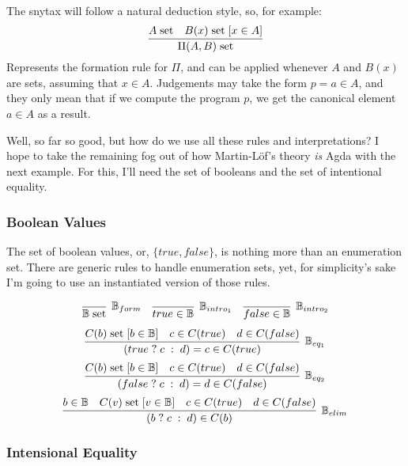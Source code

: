 \newcommand{\isset}[1]{#1 \; \text{set}}
\newcommand{\withhip}[2]{#2 \; [ #1 ] }
\newcommand{\BB}{\mathbb{B}}
\newcommand{\ite}[3]{(#1 \; ? \; #2 \; : \; #3)}
The snytax will follow a natural deduction style, so, for example: 
\[
  \infer{\isset{\Pi(A , B)}}{\isset{A} & \withhip{x \in A}{\isset{B(x)}}}
\]
Represents the formation rule for $\Pi$, and can be applied whenever $A$ and $B(x)$ are sets,
assuming that $x \in A$. Judgements may take the form $p = a \in A$, and they only mean 
that if we compute the program $p$, we get the canonical element $a \in A$ as a result.

Well, so far so good, but how do we use all these rules and interpretations? I hope to take the
remaining fog out of how Martin-L\"{o}f's theory \emph{is} Agda with the next example. For this,
I'll need the set of booleans and the set of intentional equality.

\subsubsection{Boolean Values}

The set of boolean values, or, $\{ true, false \}$, is nothing more than an enumeration set.
There are generic rules to handle enumeration sets, yet, for simplicity's sake I'm going to use an instantiated
version of those rules.

\[ 
\begin{array}{c c c}
    \infer[\BB_{form}]{ \isset{\BB} }{} 
  & \infer[\BB_{intro_1}]{true \in \BB}{}
  & \infer[\BB_{intro_2}]{false \in \BB}{}
\end{array}
\]
\[
    \infer[\BB_{eq_1}]
          {\ite{true}{c}{d} = c \in C(true)}
          {\withhip{b \in \BB}{\isset{C(b)}}
          & c \in C(true)
          & d \in C(false)
          }
\] 
\vspace{2mm}
\[
    \infer[\BB_{eq_2}]
          {\ite{false}{c}{d} = d \in C(false)}
          {\withhip{b \in \BB}{\isset{C(b)}}
          & c \in C(true)
          & d \in C(false)
          }
\] 
\vspace{2mm}
\[
    \infer[\BB_{elim}]
          {\ite{b}{c}{d} \in C(b)}
          { b \in \BB
          & \withhip{v \in \BB}{\isset{C(v)}}
          & c \in C(true)
          & d \in C(false)
          }
\]
\vspace{2mm}

\subsubsection{Intensional Equality}

